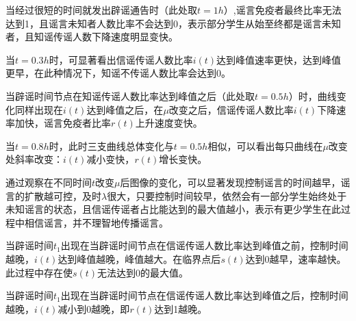 \documentclass[withoutpreface,bwprint]{cumcmthesis}
\begin{document}
当经过很短的时间就发出辟谣通告时（此处取$t = 1h$）,谣言免疫者最终比率无法达到1，且谣言未知者人数比率不会达到0，表示部分学生从始至终都是谣言未知者，且知谣传谣人数下降速度明显变快。

当$t = 0.3h$时，可显著看出信谣传谣人数比率$i(t)$达到峰值速率更快，达到峰值更早，在此种情况下，知谣不传谣人数比率会达到0。

当辟谣时间节点在知谣传谣人数比率达到峰值之后（此处取$t = 0.5h$）时，曲线变化同样出现在$i(t)$达到峰值之后，在$\mu$改变之后，信谣传谣人数比率$i(t)$下降速率加快，谣言免疫者比率$r(t)$上升速度变快。

当$t = 0.8h$时，此时三支曲线总体变化与$t = 0.5h$相似，可以看出每只曲线在$\mu$改变处斜率改变：$i(t)$减小变快，$r(t)$增长变快。

通过观察在不同时间$t$改变$\mu$后图像的变化，可以显著发现控制谣言的时间越早，谣言的扩散越可控，及时$\lambda$很大，只要控制时间较早，依然会有一部分学生始终处于未知谣言的状态，且信谣传谣者占比能达到的最大值越小，表示有更少学生在此过程中相信谣言，并不理智地传播谣言。

当辟谣时间$t_1$出现在当辟谣时间节点在信谣传谣人数比率达到峰值之前，控制时间越晚，$i(t)$达到峰值越晚，峰值越大。在临界点后$s(t)$达到0越早，速率越快。此过程中存在使$s(t)$无法达到0的最大值。

当辟谣时间$t_1$出现在当辟谣时间节点在信谣传谣人数比率达到峰值之后，控制时间越晚，$i(t)$减小到0越晚，即$r(t)$达到1越晚。
\end{document}
